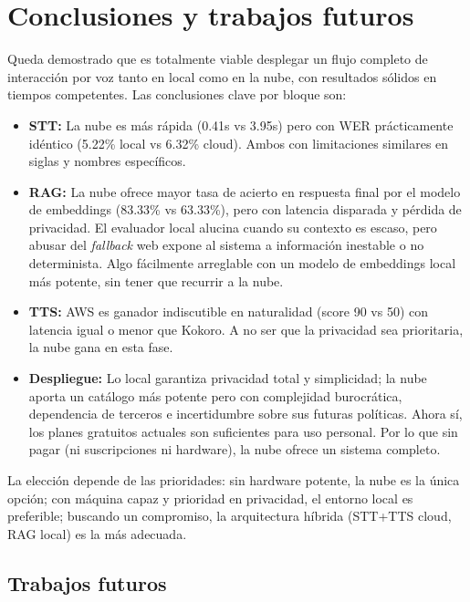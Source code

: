 \documentclass[11pt,spanish,listoffigures,listoftables]{tfgetsinf}
\begin{document}
\chapter{Conclusiones y trabajos futuros}

Queda demostrado que es totalmente viable desplegar un flujo completo de interacción por voz tanto en local como en la nube, con resultados sólidos en tiempos competentes. Las conclusiones clave por bloque son:

\begin{itemize}
    \item \textbf{STT:} La nube es más rápida (0.41s vs 3.95s) pero con WER prácticamente idéntico (5.22\% local vs 6.32\% cloud). Ambos con limitaciones similares en siglas y nombres específicos.
    \item \textbf{RAG:} La nube ofrece mayor tasa de acierto en respuesta final por el modelo de embeddings (83.33\% vs 63.33\%), pero con latencia disparada y pérdida de privacidad. El evaluador local alucina cuando su contexto es escaso, pero abusar del \textit{fallback} web expone al sistema a información inestable o no determinista. Algo fácilmente arreglable con un modelo de embeddings local más potente, sin tener que recurrir a la nube.
    \item \textbf{TTS:} AWS es ganador indiscutible en naturalidad (score 90 vs 50) con latencia igual o menor que Kokoro. A no ser que la privacidad sea prioritaria, la nube gana en esta fase.
    \item \textbf{Despliegue:} Lo local garantiza privacidad total y simplicidad; la nube aporta un catálogo más potente pero con complejidad burocrática, dependencia de terceros e incertidumbre sobre sus futuras políticas. Ahora sí, los planes gratuitos actuales son suficientes para uso personal. Por lo que sin pagar (ni suscripciones ni hardware), la nube ofrece un sistema completo.
\end{itemize}

La elección depende de las prioridades: sin hardware potente, la nube es la única opción; con máquina capaz y prioridad en privacidad, el entorno local es preferible; buscando un compromiso, la arquitectura híbrida (STT+TTS cloud, RAG local) es la más adecuada.

\section{Trabajos futuros}
\end{document}
